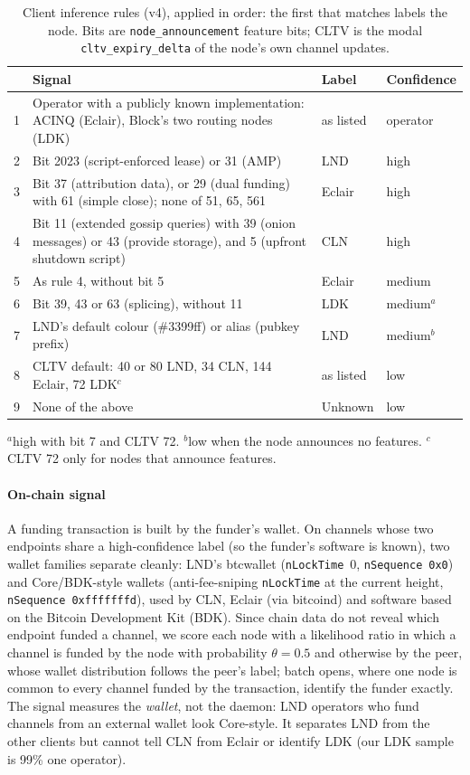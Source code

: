 \documentclass[conference]{IEEEtran}
\begin{document}
\begin{table}[t]
\centering
\caption{Client inference rules (v4), applied in order: the first that matches labels the node. Bits are
\texttt{node\_announcement} feature bits; CLTV is the modal \texttt{cltv\_expiry\_delta} of the node's own channel
updates.}
\label{tab:rules}
\footnotesize
\begin{tabular}{@{}rp{4.55cm}ll@{}}
\toprule
& Signal & Label & Confidence \\
\midrule
1 & Operator with a publicly known implementation: ACINQ (Eclair), Block's two routing nodes (LDK) & as listed &
operator \\
2 & Bit 2023 (script-enforced lease) or 31 (AMP) & LND & high \\
3 & Bit 37 (attribution data), or 29 (dual funding) with 61 (simple close); none of 51, 65, 561 & Eclair & high \\
4 & Bit 11 (extended gossip queries) with 39 (onion messages) or 43 (provide storage), and 5 (upfront shutdown
script) & CLN & high \\
5 & As rule 4, without bit 5 & Eclair & medium \\
6 & Bit 39, 43 or 63 (splicing), without 11 & LDK & medium$^{a}$ \\
7 & LND's default colour (\#3399ff) or alias (pubkey prefix) & LND & medium$^{b}$ \\
8 & CLTV default: 40 or 80 LND, 34 CLN, 144 Eclair, 72 LDK$^{c}$ & as listed & low \\
9 & None of the above & Unknown & low \\
\bottomrule
\end{tabular}
\par\vspace{2pt}\parbox{\columnwidth}{\footnotesize $^{a}$high with bit 7 and CLTV 72. $^{b}$low when the node
announces no features. $^{c}$CLTV 72 only for nodes that announce features.}
\end{table}

\paragraph*{On-chain signal}
A funding transaction is built by the funder's wallet. On channels whose two endpoints share a
high-confidence label (so the funder's software is known), two wallet families separate cleanly: LND's
btcwallet (\texttt{nLockTime}~0, \texttt{nSequence}~\texttt{0x0}) and Core/BDK-style wallets (anti-fee-sniping
\texttt{nLockTime} at the current height, \texttt{nSequence}~\texttt{0xfffffffd}), used by CLN, Eclair (via
bitcoind) and software based on the Bitcoin Development Kit (BDK). Since chain data do not reveal which endpoint funded a channel, we score
each node with a likelihood ratio in which a channel is funded by the node with probability $\theta=0.5$ and
otherwise by the peer, whose wallet distribution follows the peer's label; batch opens, where one node is
common to every channel funded by the transaction, identify the funder exactly. The signal measures the
\emph{wallet}, not the daemon: LND operators who fund channels from an external wallet look Core-style. It
separates LND from the other clients but cannot tell CLN from Eclair or identify LDK (our LDK sample is 99\% one
operator).
\end{document}
